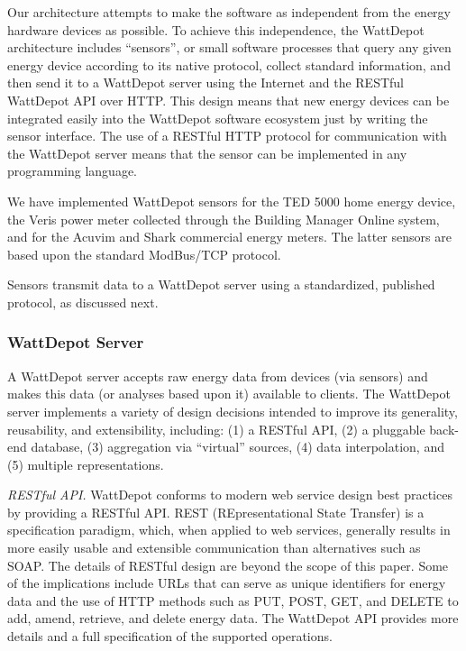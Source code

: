 Our architecture attempts to make the software as independent from
the energy hardware devices as possible.  To achieve this independence, the
WattDepot architecture includes ``sensors'', or small software processes
that query any given energy device according to its native protocol,
collect standard information, and then send it to a WattDepot server using
the Internet and the RESTful WattDepot API over HTTP.  This design means
that new energy devices can be integrated easily into the WattDepot
software ecosystem just by writing the sensor interface.  The use of a
RESTful HTTP protocol for communication with the WattDepot server means
that the sensor can be implemented in any programming language.

We have implemented WattDepot sensors for the TED 5000 home energy device, 
the Veris power meter collected through the Building Manager Online system,
and for the Acuvim and Shark commercial energy meters. The latter sensors
are based upon the standard ModBus/TCP protocol. 

Sensors transmit data to a WattDepot server using a standardized, published
protocol, as discussed next.

\subsubsection{WattDepot Server}

A WattDepot server accepts raw energy data from devices (via sensors) and
makes this data (or analyses based upon it) available to clients.  The
WattDepot server implements a variety of design decisions intended to
improve its generality, reusability, and extensibility, including: (1) a
RESTful API, (2) a pluggable back-end database, (3) aggregation via
``virtual'' sources, (4) data interpolation, and (5) multiple
representations.

{\em RESTful API.} WattDepot conforms to modern web service design best
practices by providing a RESTful API.  REST (REpresentational State
Transfer) \cite{REST} is a specification paradigm, which, when applied to
web services, generally results in more easily usable and extensible
communication than alternatives such as SOAP. The details of RESTful design
are beyond the scope of this paper. Some of the implications include
URLs that can serve as unique identifiers for energy data and the use of HTTP
methods such as PUT, POST, GET, and DELETE to add, amend, retrieve, and
delete energy data. The WattDepot API \cite{WattDepotAPI} provides more
details and a full specification of the supported operations.

